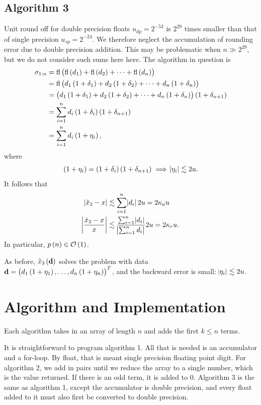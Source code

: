 \documentclass[12pt]{article}
\theoremstyle{definition}
\newcommand{\fl}[1]{\mathrm{fl}\del{#1}}
\begin{document}
\subsection{Algorithm 3}
Unit round off for double precision floats $u_{dp} = 2^{-53}$ is $2^{29}$ times smaller than that of single precision $u_{sp} = 2^{-24}$. We therefore neglect the accumulation of rounding error due to double precision addition. This may be problematic when $n \gg 2^{29}$, but we do not consider such sums here here. The algorithm in question is
\begin{align*}
\sigma_{1:n} &= \fl{\fl{d_1} + \fl{d_2} +  \cdots  + \fl{d_n}} \\
&= \fl{d_1\del{1 + \delta_1} + d_2\del{1 + \delta_2} + \cdots + d_n\del{1 + \delta_n}} \\
&= \del{d_1\del{1 + \delta_1} + d_2\del{1 + \delta_2} + \cdots + d_n\del{1 + \delta_n}}\del{1 + \delta_{n+1}} \\
&= \sum_{i=1}^n d_i \del{1 + \delta_i}\del{1 + \delta_{n+1}} \\
&= \sum_{i=1}^n d_i \del{1 + \eta_i},
\end{align*}
where
$$
\del{1 + \eta_i} = \del{1 + \delta_i}\del{1 + \delta_{n+1}} \implies \abs{\eta_i} \lesssim 2u.
$$
It follows that
\begin{align*}
\abs{\hat{x}_2 - x} &\lesssim \sum_{i=1}^n\abs{d_i}2u  = 2\kappa_a u \\
\abs{\frac{\hat{x}_2 - x}{x}}  &\lesssim \frac{\sum_{i=1}^n\abs{d_i}}{\abs{\sum_{i=1}^n d_i}}2u = 2\kappa_r u.
\end{align*}
In particular, $p\del{n} \in \mathcal{O}\del{1}$.

As before, $\hat{x}_3\del{\mathbf{d}}$ solves the problem with data $\mathbf{d}=\del{d_1\del{1+\eta_1},\dots,d_n\del{1+\eta_n}}^T$, and the backward error is small: $\abs{\eta_i} \lesssim 2u$.

\section{Algorithm and Implementation}
Each algorithm takes in an array of length $n$ and adds the first $k \leq n$ terms.

It is straightforward to program algorithm 1. All that is needed is an accumulator and a for-loop. By float, that is meant single precision floating point digit. For algorithm 2, we add in pairs until we reduce the array to a single number, which is the value returned. If there is an odd term, it is added to 0. Algorithm 3 is the same as algorithm 1, except the accumulator is double precision, and every float added to it must also first be converted to double precision.
\end{document}
